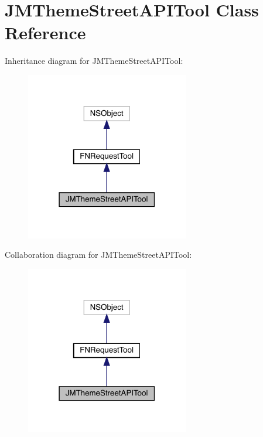 \hypertarget{interface_j_m_theme_street_a_p_i_tool}{}\section{J\+M\+Theme\+Street\+A\+P\+I\+Tool Class Reference}
\label{interface_j_m_theme_street_a_p_i_tool}


Inheritance diagram for J\+M\+Theme\+Street\+A\+P\+I\+Tool\+:\nopagebreak
\begin{figure}[H]
\begin{center}
\leavevmode
\includegraphics[width=202pt]{interface_j_m_theme_street_a_p_i_tool__inherit__graph}
\end{center}
\end{figure}


Collaboration diagram for J\+M\+Theme\+Street\+A\+P\+I\+Tool\+:\nopagebreak
\begin{figure}[H]
\begin{center}
\leavevmode
\includegraphics[width=202pt]{interface_j_m_theme_street_a_p_i_tool__coll__graph}
\end{center}
\end{figure}

